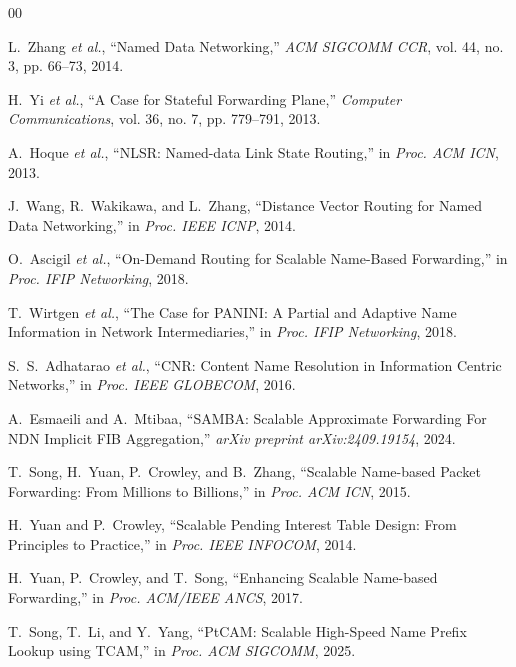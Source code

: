 \documentclass[conference]{IEEEtran}
\begin{document}

\begin{thebibliography}{00}

L.~Zhang \emph{et al.}, ``Named Data Networking,'' \emph{ACM SIGCOMM CCR}, vol. 44, no. 3, pp. 66--73, 2014.

H.~Yi \emph{et al.}, ``A Case for Stateful Forwarding Plane,'' \emph{Computer Communications}, vol. 36, no. 7, pp. 779--791, 2013.

A.~Hoque \emph{et al.}, ``NLSR: Named-data Link State Routing,'' in \emph{Proc. ACM ICN}, 2013.

J.~Wang, R.~Wakikawa, and L.~Zhang, ``Distance Vector Routing for Named Data Networking,'' in \emph{Proc. IEEE ICNP}, 2014.

O.~Ascigil \emph{et al.}, ``On-Demand Routing for Scalable Name-Based Forwarding,'' in \emph{Proc. IFIP Networking}, 2018.

T.~Wirtgen \emph{et al.}, ``The Case for PANINI: A Partial and Adaptive Name Information in Network Intermediaries,'' in \emph{Proc. IFIP Networking}, 2018.

S.~S.~Adhatarao \emph{et al.}, ``CNR: Content Name Resolution in Information Centric Networks,'' in \emph{Proc. IEEE GLOBECOM}, 2016.

A.~Esmaeili and A.~Mtibaa, ``SAMBA: Scalable Approximate Forwarding For NDN Implicit FIB Aggregation,'' \emph{arXiv preprint arXiv:2409.19154}, 2024.

T.~Song, H.~Yuan, P.~Crowley, and B.~Zhang, ``Scalable Name-based Packet Forwarding: From Millions to Billions,'' in \emph{Proc. ACM ICN}, 2015.

H.~Yuan and P.~Crowley, ``Scalable Pending Interest Table Design: From Principles to Practice,'' in \emph{Proc. IEEE INFOCOM}, 2014.

H.~Yuan, P.~Crowley, and T.~Song, ``Enhancing Scalable Name-based Forwarding,'' in \emph{Proc. ACM/IEEE ANCS}, 2017.

T.~Song, T.~Li, and Y.~Yang, ``PtCAM: Scalable High-Speed Name Prefix Lookup using TCAM,'' in \emph{Proc. ACM SIGCOMM}, 2025.


\end{thebibliography}
\end{document}
